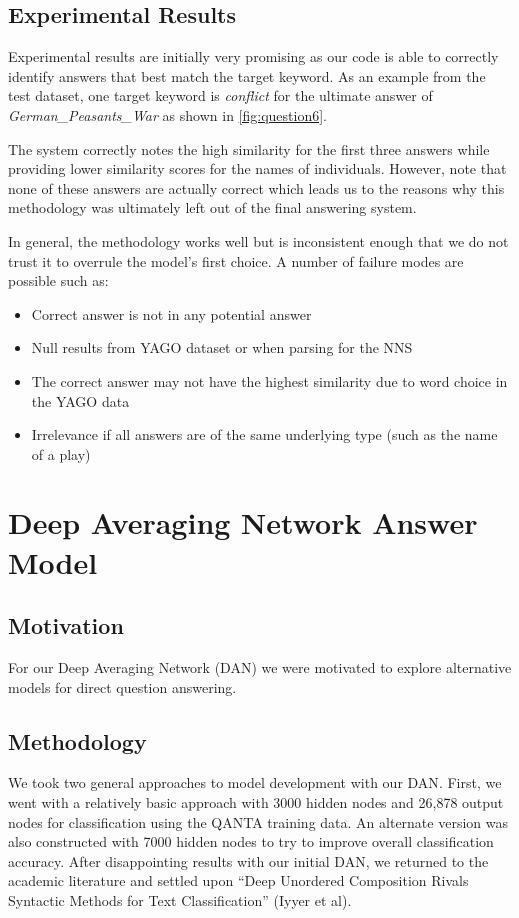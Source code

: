 \documentclass[11pt,a4paper]{article}
\begin{document}
\subsection{Experimental Results}

Experimental results are initially very promising as our code is able to correctly identify answers that best match the target keyword.  As an example from the test dataset, one target keyword is \textit{conflict} for the ultimate answer of \textit{German\_Peasants\_War} as shown in \autoref{fig:question6}.

The system correctly notes the high similarity for the first three answers while providing lower similarity scores for the names of individuals.  However, note that none of these answers are actually correct which leads us to the reasons why this methodology was ultimately left out of the final answering system.

In general, the methodology works well but is inconsistent enough that we do not trust it to overrule the model's first choice.  A number of failure modes are possible such as:

\begin{itemize}
  \itemsep0em
  \item  Correct answer is not in any potential answer
  \item  Null results from \textsc{\textsc{YAGO}} dataset or when parsing for the \textsc{NNS}
  \item  The correct answer may not have the highest similarity due to word choice in the \textsc{\textsc{YAGO}} data
  \item  Irrelevance if all answers are of the same underlying type (such as the name of a play)
 \end{itemize}


\section{Deep Averaging Network Answer Model}

\subsection{Motivation}
For our Deep Averaging Network (\textsc{DAN}) we were motivated to explore alternative models for direct question answering.

\subsection{Methodology}
We took two general approaches to model development with our \textsc{DAN}.  First, we went with a relatively basic approach with 3000 hidden nodes and 26,878 output nodes for classification using the \textsc{QANTA} training data.  An alternate version was also constructed with 7000 hidden nodes to try to improve overall classification accuracy.  After disappointing results with our initial \textsc{DAN}, we returned to the academic literature and settled upon ``Deep Unordered Composition Rivals Syntactic Methods for Text Classification'' (Iyyer et al).
\end{document}
